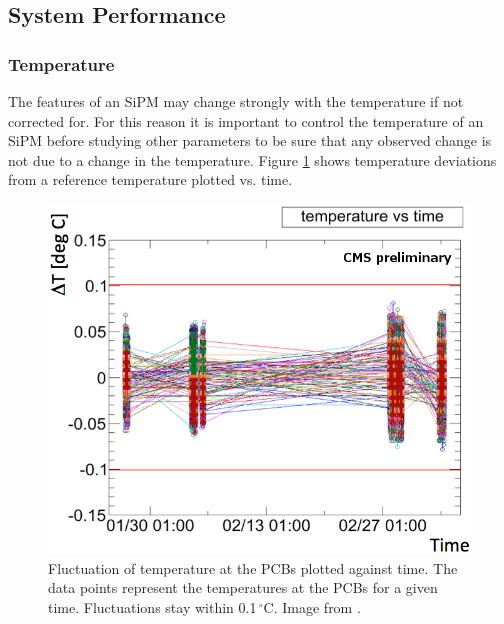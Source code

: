 \subsection{System Performance}
\subsubsection{Temperature}
The features of an SiPM may change strongly with the temperature if not corrected for. For this reason it is important to control the temperature of an SiPM before studying other parameters to be sure that any observed change is not due to a change in the temperature. Figure \ref{kuenskentemperatureStability} shows temperature deviations from a reference temperature plotted vs. time.
\begin{figure}[h]
\centering
\begin{minipage}[t]{0.475\textwidth}
\includegraphics[width=\textwidth]{Figures/kuensken/temperature.png}
\caption{Fluctuation of temperature at the PCBs plotted against time. The data points represent the temperatures at the PCBs for a given time. Fluctuations stay within 0.1\,$^\circ$C. Image from \cite{kuenskenCalor}.}
\label{kuenskentemperatureStability}
\end{minipage}
\hspace{0.5cm}
\begin{minipage}[t]{0.455\textwidth}

\end{minipage}
\end{figure}
